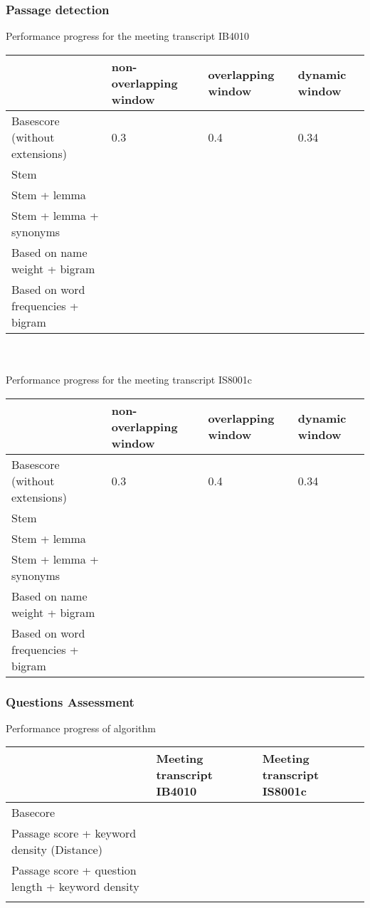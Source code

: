 \documentclass[10pt,a4paper]{article}
\begin{document}
\subsubsection{Passage detection}

Performance progress for the meeting transcript IB4010 

\begin{tabular}{|l|l|l|l|}
\hline  & non-overlapping window & overlapping window  & dynamic window  \\ 
\hline Basescore (without extensions) & 0.3 & 0.4  & 0.34  \\ 
\hline Stem &  &  &  \\ 
\hline Stem + lemma &  &  &  \\ 
\hline Stem + lemma + synonyms &  &  &  \\ 
\hline Based on name weight + bigram &  &  &  \\ 
\hline Based on word frequencies + bigram &  &  &  \\ 	   
\hline 
\end{tabular} 
\\
\\


Performance progress for the meeting transcript IS8001c 

\begin{tabular}{|l|l|l|l|}
\hline  & non-overlapping window & overlapping window  & dynamic window  \\ 
\hline Basescore (without extensions) & 0.3 & 0.4  & 0.34  \\ 
\hline Stem &  &  &  \\ 
\hline Stem + lemma &  &  &  \\ 
\hline Stem + lemma + synonyms &  &  &  \\ 
\hline Based on name weight + bigram &  &  &  \\ 
\hline Based on word frequencies + bigram &  &  &  \\ 	   
\hline 
\end{tabular} 


\subsubsection{Questions Assessment}
Performance progress of algorithm \\
\begin{tabular}{|l|l|l|}
\hline   & Meeting transcript IB4010 & Meeting transcript IS8001c  \\ 
\hline Basecore &  &  \\ 
\hline Passage score + keyword density (Distance) &  &  \\ 
\hline Passage score + question length + keyword density &  &  \\ 
\hline  &  &  \\ 
\hline 
\end{tabular} \\ \\
\end{document}
